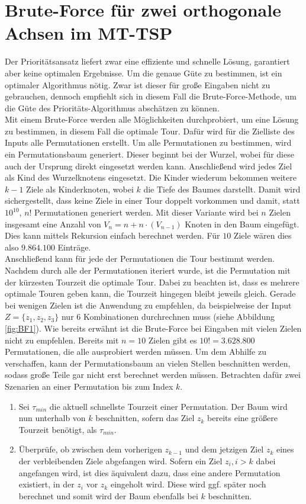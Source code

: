 \documentclass[german,version-2019-11]{uzl-thesis}
\begin{document}
\section{Brute-Force für zwei orthogonale Achsen im MT-TSP}

Der Prioritätsansatz liefert zwar eine effiziente und schnelle Lösung, garantiert aber keine optimalen Ergebnisse. Um die genaue Güte zu bestimmen, ist ein optimaler Algorithmus nötig. Zwar ist dieser für große Eingaben nicht zu gebrauchen, dennoch empfiehlt sich in diesem Fall die Brute-Force-Methode, um die Güte des Prioritäts-Algorithmus abschätzen zu können. \\
Mit einem Brute-Force werden alle Möglichkeiten durchprobiert, um eine Lösung zu bestimmen, in diesem Fall die optimale Tour. Dafür wird für die Zielliste des Inputs alle Permutationen erstellt. Um alle Permutationen zu bestimmen, wird ein Permutationsbaum generiert. Dieser beginnt bei der Wurzel, wobei für diese auch der Ursprung direkt eingesetzt werden kann. Anschließend wird jedes Ziel als Kind des Wurzelknotens eingesetzt. Die Kinder wiederum bekommen weitere $k-1$ Ziele als Kinderknoten, wobei $k$ die Tiefe des Baumes darstellt. Damit wird sichergestellt, dass keine Ziele in einer Tour doppelt vorkommen und damit, statt $10^{10}$, $n!$ Permutationen generiert werden. Mit dieser Variante wird bei $n$ Zielen insgesamt eine Anzahl von $V_n = n + n\cdot (V_{n-1})$ Knoten in den Baum eingefügt. Dies kann mittels Rekursion einfach berechnet werden. Für $10$ Ziele wären dies also $9.864.100$ Einträge.\\
Anschließend kann für jede der Permutationen die Tour bestimmt werden. Nachdem durch alle der Permutationen iteriert wurde, ist die Permutation mit der kürzesten Tourzeit die optimale Tour. Dabei zu beachten ist, dass es mehrere optimale Touren geben kann, die Tourzeit hingegen bleibt jeweils gleich. Gerade bei wenigen Zielen ist die Anwendung zu empfehlen, da beispielweise der Input $Z=\{z_1, z_2, z_3\}$ nur 6 Kombinationen durchrechnen muss (siehe Abbildung \ref{fig:BF1}). Wie bereits erwähnt ist die Brute-Force bei Eingaben mit vielen Zielen nicht zu empfehlen. Bereits mit $n=10$ Zielen gibt es $10! = 3.628.800$ Permutationen, die alle ausprobiert werden müssen. Um dem Abhilfe zu verschaffen, kann der Permutationsbaum an vielen Stellen beschnitten werden, sodass große Teile gar nicht erst berechnet werden müssen. Betrachten dafür zwei Szenarien an einer Permutation bis zum Index $k$.
\begin{enumerate}
\item
Sei $\tau_{min}$ die aktuell schnellste Tourzeit einer Permutation. Der Baum wird nun unterhalb von $k$ beschnitten, sofern das Ziel $z_k$ bereits eine größere Tourzeit benötigt, als $\tau_{min}$. 

\item
Überprüfe, ob zwischen dem vorherigen $z_{k-1}$ und dem jetzigen Ziel $z_{k}$ eines der verbleibenden Ziele abgefangen wird. Sofern ein Ziel $z_{i}, i>k$ dabei angefangen wird, ist dies äquivalent dazu, dass eine andere Permutation existiert, in der $z_i$ vor $z_k$ eingeholt wird. Diese wird ggf. später noch berechnet und somit wird der Baum ebenfalls bei $k$ beschnitten.
\end{enumerate} 
\end{document}
